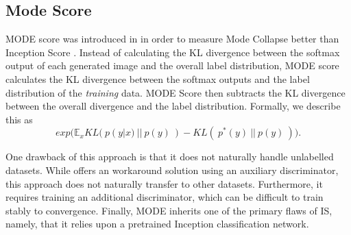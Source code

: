 \subsection{Mode Score} 
\label{sub:mode_score}
MODE score was introduced in \cite{che2016mode} in order to measure Mode Collapse better than Inception Score \cite{gulrajani2017improved}. 
Instead of calculating the KL divergence between the softmax output of each generated image and the overall label distribution, MODE score calculates the KL divergence between the softmax outputs and the label distribution of the \textit{training} data.
MODE Score then subtracts the KL divergence between the overall divergence and the label distribution.
Formally, we describe this as
\begin{equation}
	exp \Big (\mathbb{E}_xKL(\ p(y|x)\ ||\ p(y)\ ) - KL(\ p^*(y)\ ||\ p(y)\ ) \Big ).
\end{equation}

One drawback of this approach is that it does not naturally handle unlabelled datasets.
While \cite{che2016mode} offers an workaround solution using an auxiliary discriminator, this approach does not naturally transfer to other datasets. 
Furthermore, it requires training an additional discriminator, which can be difficult to train stably to convergence.
Finally, MODE inherits one of the primary flaws of IS, namely, that it relies upon a pretrained Inception classification network.
